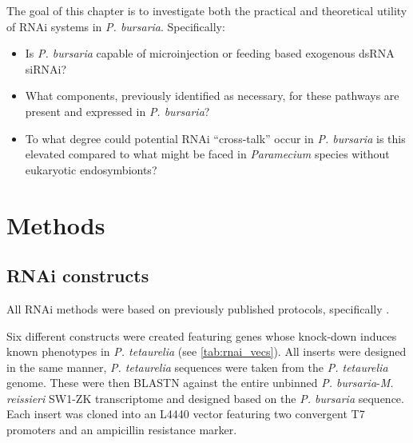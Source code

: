 The goal of this chapter is to investigate both the practical and
theoretical utility of RNAi systems in \textit{P. bursaria}. 
Specifically:
\begin{itemize}
    \item Is \textit{P. bursaria} capable of microinjection or feeding based
        exogenous dsRNA siRNAi?
    \item What components, previously identified as necessary, for these pathways
        are present and expressed in \textit{P. bursaria}? 
    \item To what degree could potential RNAi ``cross-talk'' occur in \textit{P. bursaria}
        is this elevated compared to what might be faced in \textit{Paramecium} species
        without eukaryotic endosymbionts?
\end{itemize}


\section{Methods}

\subsection{RNAi constructs}

All RNAi methods were based on previously published protocols, specifically
\citep{Galvani2001,Galvani2002,Beisson2010}.

Six different constructs were created featuring genes whose knock-down
induces known phenotypes in \textit{P. tetaurelia} (see \cref{tab:rnai_vecs}).
All inserts were designed in the same manner, \textit{P. tetaurelia} sequences
were taken from the \textit{P. tetaurelia} genome. 
These were then BLASTN against the entire unbinned \textit{P. bursaria}-\textit{M. reissieri}
SW1-ZK transcriptome and designed based on the \textit{P. bursaria} sequence.
Each insert was cloned into an L4440 vector featuring two convergent T7 promoters
and an ampicillin resistance marker. 

